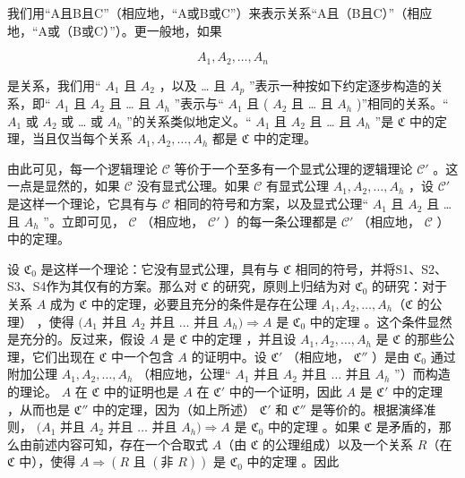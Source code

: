我们用“A且B且C”（相应地，“A或B或C”）来表示关系“A且（B且C）”（相应地，“A或（B或C）”）。更一般地，如果

\[
A _ {1}, A _ {2}, \dots , A _ {n}
\]

是关系，我们用`` \(A_{1}\) 且 \(A_{2}\) ，以及 \ldots{} 且 \(A_{p}\) ''表示一种按如下约定逐步构造的关系，即`` \(A_{1}\) 且 \(A_{2}\) 且 \ldots{} 且 \(A_{h}\) ''表示与`` \(A_{1}\) 且 ( \(A_{2}\) 且 \ldots{} 且 \(A_{h}\) )''相同的关系。`` \(A_{1}\) 或 \(A_{2}\) 或 \ldots{} 或 \(A_{h}\) ''的关系类似地定义。`` \(A_{1}\) 且 \(A_{2}\) 且 \ldots{} 且 \(A_{h}\) ''是 \(\mathfrak{C}\) 中的定理，当且仅当每个关系 \(A_{1}, A_{2}, \ldots, A_{h}\) 都是 \(\mathfrak{C}\) 中的定理。

由此可见，每一个逻辑理论 \(\mathcal{C}\) 等价于一个至多有一个显式公理的逻辑理论 \(\mathcal{C}'\) 。这一点是显然的，如果 \(\mathcal{C}\) 没有显式公理。如果 \(\mathcal{C}\) 有显式公理 \(A_{1}, A_{2}, \ldots, A_{h}\) ，设 \(\mathcal{C}'\) 是这样一个理论，它具有与 \(\mathcal{C}\) 相同的符号和方案，以及显式公理`` \(A_{1}\) 且 \(A_{2}\) 且 \ldots{} 且 \(A_{h}\) ''。立即可见， \(\mathcal{C}\) （相应地， \(\mathcal{C}'\) ）的每一条公理都是 \(\mathcal{C}'\) （相应地， \(\mathcal{C}\) ）中的定理。

设 \(\mathfrak{C}_0\) 是这样一个理论：它没有显式公理，具有与 \(\mathfrak{C}\) 相同的符号，并将S1、S2、S3、S4作为其仅有的方案。那么对 \(\mathfrak{C}\) 的研究，原则上归结为对 \(\mathfrak{C}_0\) 的研究：对于关系 \(A\) 成为 \(\mathfrak{C}\) 中的定理，必要且充分的条件是存在公理 \(A_1, A_2, \ldots, A_h\)（\(\mathfrak{C}\) 的公理） ，使得 \((A_1\) 并且 \(A_2\) 并且 \(\ldots\) 并且 \(A_h) \Longrightarrow A\) 是 \(\mathfrak{C}_0\) 中的定理 。这个条件显然是充分的。反过来，假设 \(A\) 是 \(\mathfrak{C}\) 中的定理 ，并且设 \(A_1, A_2, \ldots, A_h\) 是 \(\mathfrak{C}\) 的那些公理，它们出现在 \(\mathfrak{C}\) 中一个包含 \(A\) 的证明中。设 \(\mathfrak{C}'\) （相应地， \(\mathfrak{C}''\) ）是由 \(\mathfrak{C}_0\) 通过附加公理 \(A_1, A_2, \ldots, A_h\) （相应地，公理`` \(A_1\) 并且 \(A_2\) 并且 \(\ldots\) 并且 \(A_h\) ''）而构造的理论。 \(A\) 在 \(\mathfrak{C}\) 中的证明也是 \(A\) 在 \(\mathfrak{C}'\) 中的一个证明，因此 \(A\) 是 \(\mathfrak{C}'\) 中的定理 ，从而也是 \(\mathfrak{C}''\) 中的定理，因为（如上所述） \(\mathfrak{C}'\) 和 \(\mathfrak{C}''\) 是等价的。根据演绎准则， \((A_1\) 并且 \(A_2\) 并且 \(\ldots\) 并且 \(A_h) \Longrightarrow A\) 是 \(\mathfrak{C}_0\) 中的定理 。如果 \(\mathfrak{C}\) 是矛盾的，那么由前述内容可知，存在一个合取式 \(A\)（由 \(\mathfrak{C}\) 的公理组成）以及一个关系 \(R\)（在 \(\mathfrak{C}\) 中），使得 \(A \Longrightarrow (R \text{ 且 } (\text{非 } R))\) 是 \(\mathfrak{C}_0\) 中的定理 。因此

